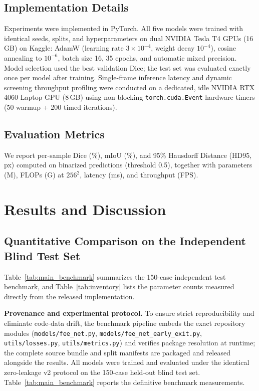 \documentclass[journal]{IEEEtran}
\begin{document}
\subsection{Implementation Details}
Experiments were implemented in PyTorch. All five models were trained with identical seeds, splits, and hyperparameters on dual NVIDIA Tesla T4 GPUs (16\,GB) on Kaggle: AdamW (learning rate $3\times10^{-4}$, weight decay $10^{-4}$), cosine annealing to $10^{-6}$, batch size 16, 35 epochs, and automatic mixed precision. Model selection used the best validation Dice; the test set was evaluated exactly once per model after training. Single-frame inference latency and dynamic screening throughput profiling were conducted on a dedicated, idle NVIDIA RTX 4060 Laptop GPU (8\,GB) using non-blocking \texttt{torch.cuda.Event} hardware timers (50 warmup + 200 timed iterations).

\subsection{Evaluation Metrics}
We report per-sample Dice (\%), mIoU (\%), and 95\% Hausdorff Distance (HD95, px) computed on binarized predictions (threshold 0.5), together with parameters (M), FLOPs (G) at $256^2$, latency (ms), and throughput (FPS).

\section{Results and Discussion}

\subsection{Quantitative Comparison on the Independent Blind Test Set}
Table~\ref{tab:main_benchmark} summarizes the 150-case independent test benchmark, and Table~\ref{tab:inventory} lists the parameter counts measured directly from the released implementation.

\textbf{Provenance and experimental protocol.} To ensure strict reproducibility and eliminate code-data drift, the benchmark pipeline embeds the exact repository modules (\texttt{models/fee\_net.py}, \texttt{models/fee\_net\_early\_exit.py}, \texttt{utils/losses.py}, \texttt{utils/metrics.py}) and verifies package resolution at runtime; the complete source bundle and split manifests are packaged and released alongside the results. All models were trained and evaluated under the identical zero-leakage v2 protocol on the 150-case held-out blind test set. Table~\ref{tab:main_benchmark} reports the definitive benchmark measurements.
\end{document}
